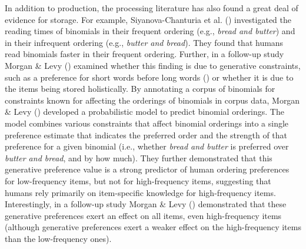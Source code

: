 \documentclass[
  12pt,
  letterpaper,
]{scrreport}
\begin{document}
In addition to production, the processing literature has also found a
great deal of evidence for storage. For example, Siyanova-Chanturia et
al. ()
investigated the reading times of binomials in their frequent ordering
(e.g., \emph{bread and butter}) and in their infrequent ordering (e.g.,
\emph{butter and bread}). They found that humans read binomials faster
in their frequent ordering. Further, in a follow-up study Morgan \& Levy
() examined
whether this finding is due to generative constraints, such as a
preference for short words before long words
()
or whether it is due to the items being stored holistically. By
annotating a corpus of binomials for constraints known for affecting the
orderings of binomials in corpus data, Morgan \& Levy
() developed a
probabilistic model to predict binomial orderings. The model combines
various constraints that affect binomial orderings into a single
preference estimate that indicates the preferred order and the strength
of that preference for a given binomial (i.e., whether \emph{bread and
butter} is preferred over \emph{butter and bread}, and by how much).
They further demonstrated that this generative preference value is a
strong predictor of human ordering preferences for low-frequency items,
but not for high-frequency items, suggesting that humans rely primarily
on item-specific knowledge for high-frequency items. Interestingly, in a
follow-up study Morgan \& Levy ()
demonstrated that these generative preferences exert an effect on all
items, even high-frequency items (although generative preferences exert
a weaker effect on the high-frequency items than the low-frequency
ones).
\end{document}
